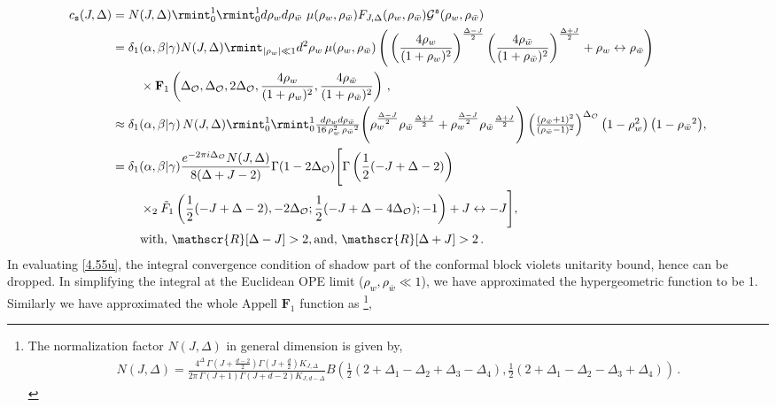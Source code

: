 \begin{align}
    \begin{split}
       c_{\texttt{s}}(J,\Delta)&=N(J,\Delta)\rmint_{0}^1\rmint_{0}^1 d\rho_w d\rho_{\bar w}\,\,\mu (\rho_w,\rho_{\bar w})F_{J,\Delta}(\rho_w,\rho_{\bar w}){\mathcal{G}}^{\mathfrak{s}}(\rho_w,\rho_{\bar w})\\&
       = \delta_1(\alpha,\beta|\gamma)N(J,\Delta)\rmint_{|\rho_w|\ll 1} d^2\rho_w \,\mu(\rho_w,\rho_{\bar w })\,\Bigg(\left(\frac{4\rho_w}{(1+\rho_w)^2}\right)^{\frac{\Delta-J}{2}}\left(\frac{4\rho_{\bar w }}{(1+\rho_{\bar w })^2}\right)^{\frac{\Delta+J}{2}}+\rho_w\leftrightarrow\rho_{\bar w}\Bigg)\\&\hspace{0.8cm}\times \mathbf{F}_{1}\left(\Delta_{\mathcal{O}},\Delta_{\mathcal{O}},2\Delta_{\mathcal{O}},\frac{4\rho_w}{(1+\rho_w)^2},\frac{4\rho_{\bar{w}}}{(1+\rho_{\bar{w}})^2}\right)\,,\\& 
        \approx \delta_1(\alpha,\beta|\gamma)\,N(J,\Delta)\textstyle{\rmint_{0}^1\rmint_{0}^1 \frac{d\rho_w d\rho_{\bar w}}{{16 \,\rho_w^2 \,\text{$\rho_{\bar w }$}^2}}{\Bigg(\rho_w ^{\frac{\Delta-J}{2}} \text{$\rho_{\bar w }$}^{\frac{\Delta+J}{2}}+\rho_w ^{\frac{\Delta-J}{2}} \text{$\rho_{\bar w }$}^{\frac{\Delta+J}{2}} \Bigg)\left(\frac{(\text{$\rho_{\bar w} $}+1)^2}{(\text{$\rho_{\bar w }$}-1)^2}\right)^{\Delta_{\mathcal{O}} } \left(1-\rho_w ^2\right) \left(1-\text{$\rho_{\bar w }$}^2\right)}},
        \\& =\delta_1(\alpha,\beta|\gamma) \frac{e^{-2\pi i\Delta_{\mathcal{O}}}N(J,\Delta)}{8 (\Delta +J-2)}\Gamma (1-2 \Delta_{\mathcal{O}} ) \Bigg[\Gamma \left(\frac{1}{2} (-J+\Delta -2)\right)\, \\&
 \hspace{0.8cm}\times_2\tilde{F}_1\left(\frac{1}{2} (-J+\Delta -2),-2 \Delta_{\mathcal{O}} ;\frac{1}{2} (-J+\Delta -4 \Delta_{\mathcal{O}} );-1\right)+J\leftrightarrow -J\Bigg],\\& \hspace{0.8cm} \textrm{with},\, \mathscr{R}[\Delta-J]>2, \textrm{and},\,\mathscr{R}[\Delta+J]>2\,.\label{4.55u}
    \end{split}
\end{align}
In evaluating \eqref{4.55u}, the integral convergence condition of  shadow part of the conformal block violets unitarity bound, hence can be dropped. In simplifying the integral at the Euclidean OPE limit (\textcolor{black}{$\rho_w,\rho_{\bar w}\ll1$}), we have approximated the hypergeometric function to be 1. Similarly we have approximated the whole $\text{Appell}\,\,\mathbf{F}_1$ function as \footnote{ The normalization factor $N(J,\Delta)$ in general dimension is given by,
\begin{align}
   N (J,\Delta)=\frac{4^\Delta \,
   \Gamma(J+\frac{d-2}{2})\Gamma(J+\frac{d}{2})K_{J,\Delta}}{ 2\pi\,\Gamma(J+1)\Gamma(J+d-2)K_{J,d-\Delta}}B\left(\frac{1}{2}(2+\Delta_1-\Delta_2+\Delta_3-\Delta_4),\frac{1}{2}(2+\Delta_1-\Delta_2-\Delta_3+\Delta_4)\right)\,.\nonumber
\end{align}},

